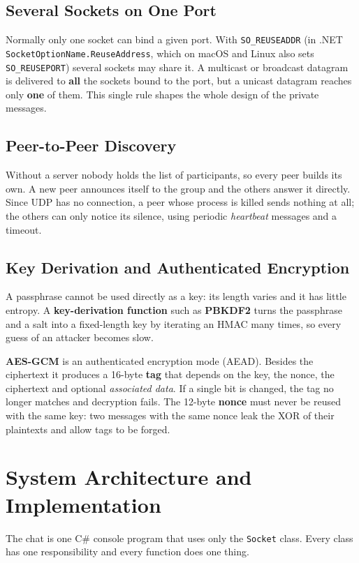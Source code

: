 \documentclass[11pt, a4paper]{article}
\begin{document}
\subsection{Several Sockets on One Port}
Normally only one socket can bind a given port. With \texttt{SO\_REUSEADDR} (in .NET \texttt{SocketOptionName.ReuseAddress}, which on macOS and Linux also sets \texttt{SO\_REUSEPORT}) several sockets may share it. A multicast or broadcast datagram is delivered to \textbf{all} the sockets bound to the port, but a unicast datagram reaches only \textbf{one} of them. This single rule shapes the whole design of the private messages.

\subsection{Peer-to-Peer Discovery}
Without a server nobody holds the list of participants, so every peer builds its own. A new peer announces itself to the group and the others answer it directly. Since UDP has no connection, a peer whose process is killed sends nothing at all; the others can only notice its silence, using periodic \emph{heartbeat} messages and a timeout.

\subsection{Key Derivation and Authenticated Encryption}
A passphrase cannot be used directly as a key: its length varies and it has little entropy. A \textbf{key-derivation function} such as \textbf{PBKDF2} turns the passphrase and a salt into a fixed-length key by iterating an HMAC many times, so every guess of an attacker becomes slow.

\textbf{AES-GCM} is an authenticated encryption mode (AEAD). Besides the ciphertext it produces a 16-byte \textbf{tag} that depends on the key, the nonce, the ciphertext and optional \emph{associated data}. If a single bit is changed, the tag no longer matches and decryption fails. The 12-byte \textbf{nonce} must never be reused with the same key: two messages with the same nonce leak the XOR of their plaintexts and allow tags to be forged.

\section{System Architecture and Implementation}
The chat is one C\# console program that uses only the \texttt{Socket} class. Every class has one responsibility and every function does one thing.
\end{document}
